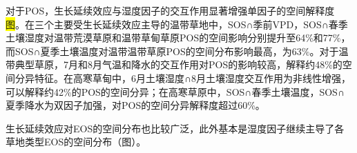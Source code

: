 对于POS，生长延续效应与湿度因子的交互作用显著增强单因子的空间解释度\colorbox{yellow}{图}。在三个主要受生长延续效应主导的温带草地中，SOS∩季前VPD，SOS∩春季土壤湿度对温带荒漠草原和温带草甸草原POS的空间影响分别提升至64\%和77\%，而SOS∩夏季土壤温度对温带温带草原POS的空间分布影响最高，为63\%。对于温带典型草原，7月和8月气温和降水的交互作用对POS的影响较高，解释约48\%的空间分异特征。在高寒草甸中，6月土壤湿度∩8月土壤湿度交互作用为非线性增强，可以解释约42\%的POS的空间分异；在高寒草原中，SOS∩春季土壤温度，SOS∩夏季降水为双因子加强，对POS的空间分异解释度超过60\%。

生长延续效应对EOS的空间分布也比较广泛，此外基本是湿度因子继续主导了各草地类型EOS的空间分布（图）。